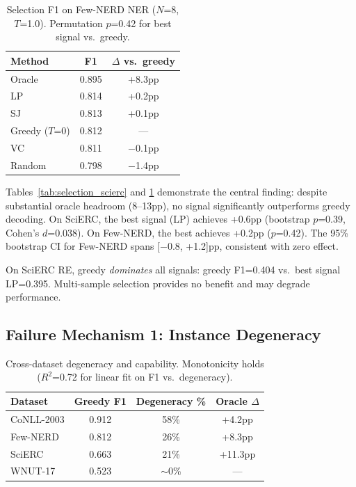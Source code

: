 \documentclass[11pt]{article}
\begin{document}
\begin{table}[t]
\centering
\small
\caption{Selection F1 on Few-NERD NER ($N$=8, $T$=1.0). Permutation $p$=0.42 for best signal vs.\ greedy.}
\label{tab:selection_fewnerd}
\begin{tabular}{lcc}
\toprule
Method & F1 & $\Delta$ vs.\ greedy \\
\midrule
Oracle & 0.895 & +8.3pp \\
LP & 0.814 & +0.2pp \\
SJ & 0.813 & +0.1pp \\
Greedy ($T$=0) & 0.812 & --- \\
VC & 0.811 & $-$0.1pp \\
Random & 0.798 & $-$1.4pp \\
\bottomrule
\end{tabular}
\end{table}

Tables~\ref{tab:selection_scierc} and \ref{tab:selection_fewnerd} demonstrate the central finding: despite substantial oracle headroom (8--13pp), no signal significantly outperforms greedy decoding. On SciERC, the best signal (LP) achieves +0.6pp (bootstrap $p$=0.39, Cohen's $d$=0.038). On Few-NERD, the best achieves +0.2pp ($p$=0.42). The 95\% bootstrap CI for Few-NERD spans [$-$0.8, +1.2]pp, consistent with zero effect.

On SciERC RE, greedy \emph{dominates} all signals: greedy F1=0.404 vs.\ best signal LP=0.395. Multi-sample selection provides no benefit and may degrade performance.

\subsection{Failure Mechanism 1: Instance Degeneracy}

\begin{table}[t]
\centering
\small
\caption{Cross-dataset degeneracy and capability. Monotonicity holds ($R^2$=0.72 for linear fit on F1 vs.\ degeneracy).}
\label{tab:degeneracy}
\begin{tabular}{lccc}
\toprule
Dataset & Greedy F1 & Degeneracy \% & Oracle $\Delta$ \\
\midrule
CoNLL-2003 & 0.912 & 58\% & +4.2pp \\
Few-NERD & 0.812 & 26\% & +8.3pp \\
SciERC & 0.663 & 21\% & +11.3pp \\
WNUT-17 & 0.523 & $\sim$0\% & --- \\
\bottomrule
\end{tabular}
\end{table}
\end{document}
